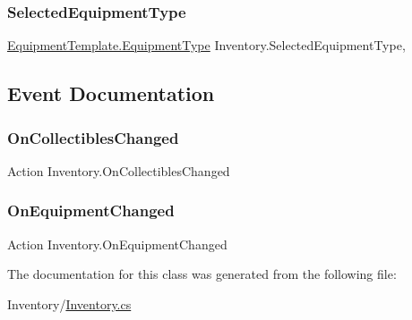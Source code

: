 \subsubsection{\texorpdfstring{Selected\+Equipment\+Type}{SelectedEquipmentType}}
{\footnotesize\ttfamily \mbox{\hyperlink{class_equipment_template_ad390a9e6257d1d050f5d5fb5a8756633}{Equipment\+Template.\+Equipment\+Type}} Inventory.\+Selected\+Equipment\+Type\hspace{0.3cm}{\ttfamily [get]}, {\ttfamily [set]}}



\subsection{Event Documentation}
\mbox{\label{class_inventory_a1ddc2ee12b405f88efdd200fb71dcdee}} 
\subsubsection{\texorpdfstring{On\+Collectibles\+Changed}{OnCollectiblesChanged}}
{\footnotesize\ttfamily Action Inventory.\+On\+Collectibles\+Changed}

\mbox{\label{class_inventory_a6e455a6cdc0133602282668e23b72c04}} 
\subsubsection{\texorpdfstring{On\+Equipment\+Changed}{OnEquipmentChanged}}
{\footnotesize\ttfamily Action Inventory.\+On\+Equipment\+Changed}



The documentation for this class was generated from the following file\+:\begin{DoxyCompactItemize}
\item 
Inventory/\mbox{\hyperlink{_inventory_8cs}{Inventory.\+cs}}\end{DoxyCompactItemize}
